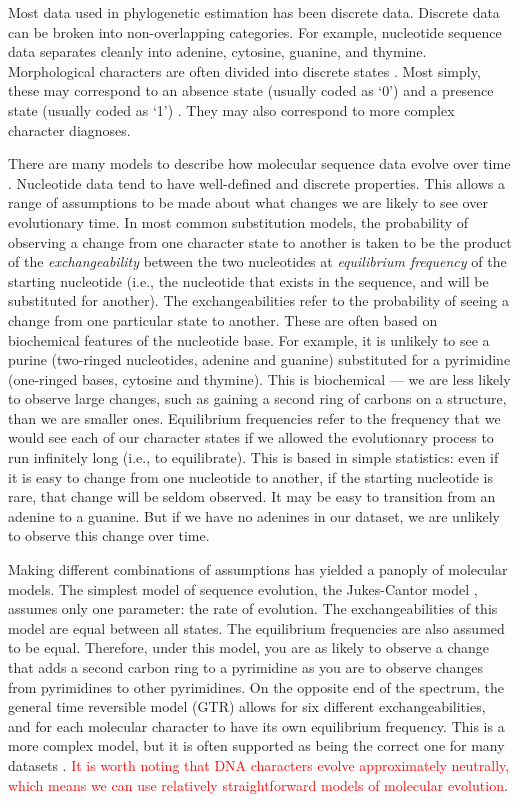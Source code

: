 \documentclass[11pt]{article}
\newcommand{\edit}[1]{{\textcolor{red}{#1}}} %
\begin{document}
Most data used in phylogenetic estimation has been discrete data.
Discrete data can be broken into non-overlapping categories.
For example, nucleotide sequence data separates cleanly into adenine, cytosine, guanine, and thymine.
Morphological characters are often divided into discrete states \cite{de1985ontogenetic}.
Most simply, these may correspond to an absence state (usually coded as `0') and a presence state (usually coded as `1') \cite{watrous1981}.
They may also correspond to more complex character diagnoses.

There are many models to describe how molecular sequence data evolve over time \cite{Jukes1969, Kimura1980, Felsenstein1981, Hasegawa1985, Tavare1986}.
Nucleotide data tend to have well-defined and discrete properties.
This allows a range of assumptions to be made about what changes we are likely to see over evolutionary time.
In most common substitution models, the probability of observing a change from one character state to another is taken to be the product of the \textit{exchangeability} between the two nucleotides at \textit{equilibrium frequency} of the starting nucleotide (i.e., the nucleotide that exists in the sequence, and will be substituted for another). 
The exchangeabilities refer to the probability of seeing a change from one particular state to another.
These are often based on biochemical features of the nucleotide base.
For example, it is unlikely to see a purine (two-ringed nucleotides, adenine and guanine) substituted for a pyrimidine (one-ringed bases, cytosine and thymine). 
This is biochemical --- we are less likely to observe large changes, such as gaining a second ring of carbons on a structure, than we are smaller ones.
Equilibrium frequencies refer to the frequency that we would see each of our character states if we allowed the evolutionary process to run infinitely long (i.e., to equilibrate).
This is based in simple statistics: even if it is easy to change from one nucleotide to another, if the starting nucleotide is rare, that change will be seldom observed.
It may be easy to transition from an adenine to a guanine.
But if we have no adenines in our dataset, we are unlikely to observe this change over time.
\clearpage

Making different combinations of assumptions has yielded a panoply of molecular models.
The simplest model of sequence evolution, the Jukes-Cantor model \cite{Jukes1969}, assumes only one parameter: the rate of evolution.
The exchangeabilities of this model are equal between all states. 
The equilibrium frequencies are also assumed to be equal.
Therefore, under this model, you are as likely to observe a change that adds a second carbon ring to a pyrimidine as you are to observe changes from pyrimidines to other pyrimidines.
On the opposite end of the spectrum, the general time reversible model (GTR) \cite{Tavare1986} allows for six different exchangeabilities, and for each molecular character to have its own equilibrium frequency.
This is a more complex model, but it is often supported as being the correct one for many datasets \cite{abadi2019}.
\edit{It is worth noting that DNA characters evolve approximately neutrally, which means we can use relatively straightforward models of molecular evolution}.
\end{document}

